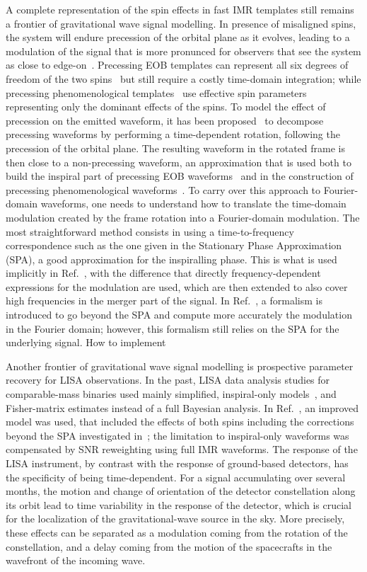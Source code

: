 \documentclass[aps,showpacs,%
prd,superscriptaddress,nofootinbib]{revtex4}
\begin{document}
A complete representation of the spin effects in fast IMR templates still remains a frontier of gravitational wave signal modelling. In presence of misaligned spins, the system will endure precession of the orbital plane as it evolves, leading to a modulation of the signal that is more pronunced for observers that see the system as close to edge-on~\cite{ACST94}. Precessing EOB templates can represent all six degrees of freedom of the two spins~\cite{Pan+13, BTB16} but still require a costly time-domain integration; while precessing phenomenological templates~\cite{Hannam+13} use effective spin parameters representing only the dominant effects of the spins. To model the effect of precession on the emitted waveform, it has been proposed~\cite{BCV03b, BCPTV05, Schmidt+10, OShaughnessy+11, Boyle+11} to decompose precessing waveforms by performing a time-dependent rotation, following the precession of the orbital plane. The resulting waveform in the rotated frame is then close to a non-precessing waveform, an approximation that is used both to build the inspiral part of precessing EOB waveforms~\cite{Pan+13} and in the construction of precessing phenomenological waveforms~\cite{Hannam+13}. To carry over this approach to Fourier-domain waveforms, one needs to understand how to translate the time-domain modulation created by the frame rotation into a Fourier-domain modulation. The most straightforward method consists in using a time-to-frequency correspondence such as the one given in the Stationary Phase Approximation (SPA), a good approximation for the inspiralling phase. This is what is used implicitly in Ref.~\cite{Hannam+13}, with the difference that directly frequency-dependent expressions for the modulation are used, which are then extended to also cover high frequencies in the merger part of the signal. In Ref.~\cite{Klein+14}, a formalism is introduced to go beyond the SPA and compute more accurately the modulation in the Fourier domain; however, this formalism still relies on the SPA for the underlying signal. How to implement 

Another frontier of gravitational wave signal modelling is prospective parameter recovery for LISA observations. In the past, LISA data analysis studies for comparable-mass binaries used mainly simplified, inspiral-only models~\cite{}, and Fisher-matrix estimates instead of a full Bayesian analysis. In Ref.~\cite{Klein+15}, an improved model was used, that included the effects of both spins including the corrections beyond the SPA investigated in~\cite{Klein+14}; the limitation to inspiral-only waveforms was compensated by SNR reweighting using full IMR waveforms. The response of the LISA instrument, by contrast with the response of ground-based detectors, has the specificity of being time-dependent. For a signal accumulating over several months, the motion and change of orientation of the detector constellation along its orbit lead to time variability in the response of the detector, which is crucial for the localization of the gravitational-wave source in the sky. More precisely, these effects can be separated as a modulation coming from the rotation of the constellation, and a delay coming from the motion of the spacecrafts in the wavefront of the incoming wave.
\end{document}
